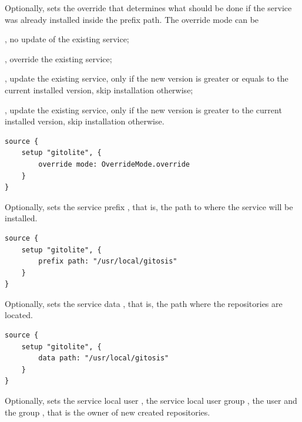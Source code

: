 Optionally, sets the override  that determines what should be done if the
service was already installed inside the prefix path. The override mode can be
\begin{compactitem}
\item {}, no update of the existing service;
\item {}, override the existing service;
\item {}, update the existing service, only if the 
new version is greater or equals to the current installed version, 
skip installation otherwise;
\item {}, update the existing service, only if the 
new version is greater to the current installed version, 
skip installation otherwise.
\end{compactitem}

\begin{lstlisting}[style=Java]
source {
    setup "gitolite", {
        override mode: OverrideMode.override
    }
}
\end{lstlisting}


Optionally, sets the service prefix , that is, the path to where the service
will be installed.

\begin{lstlisting}[style=Java]
source {
    setup "gitolite", {
        prefix path: "/usr/local/gitosis"
    }
}
\end{lstlisting}


Optionally, sets the service data , that is, the path where the repositories
are located.

\begin{lstlisting}[style=Java]
source {
    setup "gitolite", {
        data path: "/usr/local/gitosis"
    }
}
\end{lstlisting}


Optionally, sets the service local user , the service local user 
group , the user  and the group , that is the 
owner of new created repositories.

